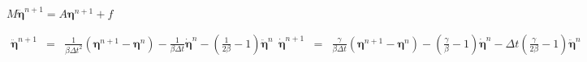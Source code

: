 \documentclass{article}
\begin{document}
$ M \ddot{\boldsymbol{\eta}}^{n+1} = A \boldsymbol{\eta}^{n+1} + f $
\pagebreak

\begin{eqnarray} \ddot{\boldsymbol{\eta}}^{n+1} &=& \frac{1}{\beta \Delta t^2} \left( \boldsymbol{\eta}^{n+1}-\boldsymbol{\eta}^{n} \right) - \frac{1}{\beta \Delta t} \dot{\boldsymbol{\eta}}^{n} - \left( \frac{1}{2 \beta} -1 \right) \ddot{\boldsymbol{\eta}}^{n} \ \ \dot{\boldsymbol{\eta}}^{n+1} &=& \frac{\gamma}{\beta \Delta t} \left( \boldsymbol{\eta}^{n+1}-\boldsymbol{\eta}^{n} \right) - \left( \frac{\gamma}{\beta} -1 \right) \dot{\boldsymbol{\eta}}^{n} - \Delta t \left( \frac{\gamma}{2\beta}-1 \right) \ddot{\boldsymbol{\eta}}^{n} \end{eqnarray}
\pagebreak
\end{document}
